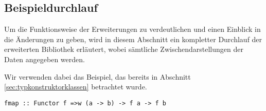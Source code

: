 \subsection{Beispieldurchlauf}

Um die Funktionsweise der Erweiterungen zu verdeutlichen und einen Einblick in die Änderungen zu geben, wird in diesem Abschnitt
ein kompletter Durchlauf der erweiterten Bibliothek erläutert, wobei sämtliche Zwischendarstellungen der Daten angegeben werden.

Wir verwenden dabei das Beispiel, das bereits in Abschnitt \ref{sec:typkonstruktorklassen} betrachtet wurde.

\begin{verbatim}
fmap :: Functor f =>w (a -> b) -> f a -> f b
\end{verbatim}

